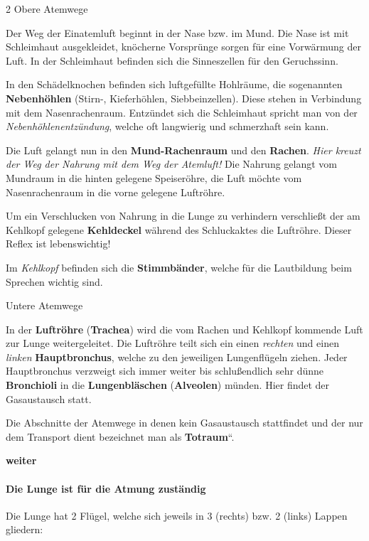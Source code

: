 \documentclass{article}
\newcommand\gEs[1]{\textbf{\textcolor[rgb]{0.0,0.0,0.5019608}{#1}}}
\newcommand\gEs[1]{\textbf{\textcolor[rgb]{0.0,0.0,0.5019608}{#1}}}
\newcommand\gT[1]{\textbf{\textup{\textcolor[rgb]{0.0,0.5019608,0.0}{#1}}}}
\newcommand\gE[1]{\textit{#1}}
\begin{document}
\begin{multicols}{2}
{\mdseries\color{black}
Obere Atemwege}

{\mdseries
Der Weg der Einatemluft beginnt in der Nase bzw. im Mund. Die Nase ist
mit Schleimhaut ausgekleidet, kn\"ocherne Vorspr\"unge sorgen f\"ur
eine Vorw\"armung der Luft. In der Schleimhaut be\-finden sich die
Sinneszellen f\"ur den Geruchssinn. }

{\mdseries
In den Sch\"adelknochen befinden sich luft\-ge\-f\"ullte Hohlr\"aume,
die so\-genannten \gT{Neben\-h\"ohlen} (Stirn-,
Kiefer\-h\"ohlen, Siebbeinzellen). Diese stehen in Verbindung mit dem
Nasenrachenraum. Entz\"undet sich die Schleimhaut spricht man von der
\gE{Neben\-h\"ohlen\-ent\-z\"undung}, welche oft
langwierig und schmerzhaft sein kann. }

{\mdseries
Die Luft gelangt nun in den \gT{Mund-Rachen\-raum} und
den \gT{Rachen}. \gE{Hier kreuzt der Weg
der Nahrung mit dem Weg der Atemluft!} Die Nahrung gelangt vom Mundraum
in die hinten gelegene Speiser\"ohre, die Luft m\"ochte vom
Nasen\-rachen\-raum in die vorne gelegene Luftr\"ohre. }

{\mdseries
Um ein Verschlucken von Nahrung in die Lunge zu verhindern
verschlie{\ss}t der am Kehlkopf gelegene \gT{Kehldeckel}
w\"ahrend des Schluckaktes die Luftr\"ohre. Dieser Reflex ist
lebenswichtig! }

{\mdseries
Im \gE{Kehlkopf}  befinden sich die
\gT{Stimmb\"ander}, welche f\"ur die Lautbildung beim
Sprechen wichtig sind.}

{\mdseries\color{black}
Untere Atemwege}

{\mdseries
In der \gT{Luftr\"ohre} (\gT{Trachea})
wird die vom Rachen und Kehlkopf kommende Luft zur Lunge
weitergeleitet. Die Luftr\"ohre teilt sich ein einen
\gE{rechten} und einen \gE{linken}
\gT{Hauptbronchus}, welche zu den jeweiligen
Lungenfl\"ugeln ziehen. Jeder Hauptbronchus verzweigt sich immer weiter
bis schlu{\ss}endlich sehr d\"unne \gT{Bronchioli} in
die \gT{Lungenbl\"aschen} (\gT{Alveolen})
m\"unden. Hier findet der Gasaustausch statt. }

{\mdseries
Die Abschnitte der Atemwege in denen kein Gasaustausch stattfindet und
der nur dem Transport dient bezeichnet man als
{\quotedblbase}\gT{Totraum}{\textquotedblleft}.}

\end{multicols}
{\bfseries\color[rgb]{0.5019608,0.0,0.0}
weiter}

\paragraph[Die Lunge ist f\"ur die Atmung zust\"andig]{Die
\gEs{Lunge} ist f\"ur die Atmung zust\"andig}
{\mdseries
Die Lunge hat 2 Fl\"ugel, welche sich jeweils in 3 (rechts) bzw. 2
(links) Lappen gliedern: }
\end{document}
